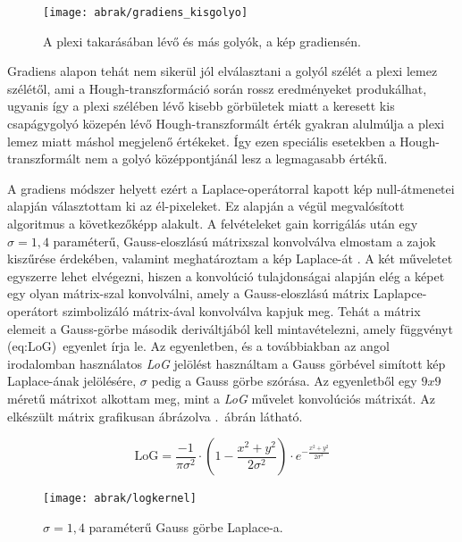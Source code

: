 \documentclass[a4paper,12pt]{article}
\begin{document}
\begin{figure}[htbp]
\center
\texttt{[image: abrak/gradiens\_kisgolyo]}
\caption{A plexi takarásában lévő és más golyók, a kép gradiensén.}
\label{fig:kisgolyo2}
\end{figure}

Gradiens alapon tehát nem sikerül jól elválasztani a golyól szélét a plexi lemez szélétől, ami a Hough-transzformáció során rossz eredményeket produkálhat, ugyanis így  a plexi szélében lévő kisebb görbületek miatt a keresett kis csapágygolyó közepén lévő Hough-transzformált érték gyakran alulmúlja a plexi lemez miatt máshol megjelenő értékeket. Így ezen speciális esetekben a Hough-transzformált nem a golyó középpontjánál lesz a legmagasabb értékű.


A gradiens módszer helyett ezért a Laplace-operátorral kapott kép null-átmenetei alapján választottam ki az él-pixeleket. Ez alapján a végül megvalósított algoritmus a következőképp alakult. A felvételeket gain korrigálás után egy $\sigma = 1,\!4$ paraméterű, Gauss-eloszlású mátrixszal konvolválva elmostam a zajok kiszűrése érdekében, valamint meghatároztam a kép Laplace-át . A két műveletet egyszerre lehet elvégezni, hiszen a konvolúció tulajdonságai alapján elég a képet egy olyan mátrix-szal konvolválni, amely a Gauss-eloszlású mátrix Laplapce-operátort szimbolizáló mátrix-ával konvolválva kapjuk meg.  Tehát a mátrix elemeit a Gauss-görbe második deriváltjából kell mintavételezni, amely függvényt \aref({eq:LoG})~egyenlet írja le. Az egyenletben, és a továbbiakban az angol irodalomban használatos \emph{LoG} jelölést használtam a Gauss görbével simított kép Laplace-ának jelölésére, $\sigma$ pedig a Gauss görbe szórása. Az egyenletből egy $9x9$ méretű mátrixot alkottam meg, mint a \emph{LoG} művelet konvolúciós mátrixát. Az elkészült mátrix grafikusan ábrázolva .~ábrán látható.

\begin{equation}
\label{eq:LoG}
\text{LoG} = \frac{-1}{\pi \sigma^2} \cdot \left ( 1-\frac{x^2+y^2}{2\sigma^2} \right ) \cdot e^{-\frac{x^2+y^2}{2\sigma^2}}
\end{equation}

\begin{figure}[htbp]
\center
\texttt{[image: abrak/logkernel]}
\caption{$\sigma = 1,\!4$ paraméterű Gauss görbe Laplace-a.}
\label{fig:logkernel}
\end{figure}
\end{document}
